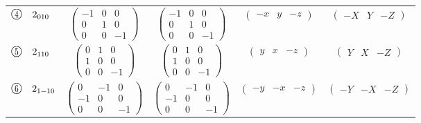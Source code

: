 \documentclass[fleqn,10pt,landscape]{jsarticle}
\begin{document}
\begin{center}
\begin{longtable}{lcccc}
$ {\ooalign{\hfil\resizebox{.8\width}{\height}{4}\hfil\crcr\raise.1ex\hbox{\large$\bigcirc$}}}\quad 2{}_{010} $ & $ \begin{pmatrix} -1 & 0 & 0 \\ 0 & 1 & 0 \\ 0 & 0 & -1 \end{pmatrix} $ & $ \begin{pmatrix} -1 & 0 & 0 \\ 0 & 1 & 0 \\ 0 & 0 & -1 \end{pmatrix} $ & $ \begin{pmatrix} - x & y & - z \end{pmatrix} $ & $ \begin{pmatrix} - X & Y & - Z \end{pmatrix} $ \\
$ {\ooalign{\hfil\resizebox{.8\width}{\height}{5}\hfil\crcr\raise.1ex\hbox{\large$\bigcirc$}}}\quad 2{}_{110} $ & $ \begin{pmatrix} 0 & 1 & 0 \\ 1 & 0 & 0 \\ 0 & 0 & -1 \end{pmatrix} $ & $ \begin{pmatrix} 0 & 1 & 0 \\ 1 & 0 & 0 \\ 0 & 0 & -1 \end{pmatrix} $ & $ \begin{pmatrix} y & x & - z \end{pmatrix} $ & $ \begin{pmatrix} Y & X & - Z \end{pmatrix} $ \\
$ {\ooalign{\hfil\resizebox{.8\width}{\height}{6}\hfil\crcr\raise.1ex\hbox{\large$\bigcirc$}}}\quad 2{}_{1-10} $ & $ \begin{pmatrix} 0 & -1 & 0 \\ -1 & 0 & 0 \\ 0 & 0 & -1 \end{pmatrix} $ & $ \begin{pmatrix} 0 & -1 & 0 \\ -1 & 0 & 0 \\ 0 & 0 & -1 \end{pmatrix} $ & $ \begin{pmatrix} - y & - x & - z \end{pmatrix} $ & $ \begin{pmatrix} - Y & - X & - Z \end{pmatrix} $ \\

\end{longtable}
\end{center}
\end{document}
